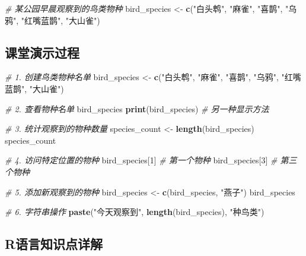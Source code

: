 \documentclass[
  twoside]{book}
\newenvironment{Shaded}{\begin{snugshade}}{\end{snugshade}}
\newcommand{\CommentTok}[1]{\textcolor[rgb]{0.56,0.35,0.01}{\textit{#1}}}
\newcommand{\DecValTok}[1]{\textcolor[rgb]{0.00,0.00,0.81}{#1}}
\newcommand{\FunctionTok}[1]{\textcolor[rgb]{0.13,0.29,0.53}{\textbf{#1}}}
\newcommand{\NormalTok}[1]{#1}
\newcommand{\OtherTok}[1]{\textcolor[rgb]{0.56,0.35,0.01}{#1}}
\newcommand{\StringTok}[1]{\textcolor[rgb]{0.31,0.60,0.02}{#1}}
\begin{document}
\begin{Shaded}
\begin{Highlighting}[]
\CommentTok{\# 某公园早晨观察到的鸟类物种}
\NormalTok{bird\_species }\OtherTok{\textless{}{-}} \FunctionTok{c}\NormalTok{(}\StringTok{"白头鹎"}\NormalTok{, }\StringTok{"麻雀"}\NormalTok{, }\StringTok{"喜鹊"}\NormalTok{, }\StringTok{"乌鸦"}\NormalTok{, }\StringTok{"红嘴蓝鹊"}\NormalTok{, }\StringTok{"大山雀"}\NormalTok{)}
\end{Highlighting}
\end{Shaded}

\hypertarget{ux8bfeux5802ux6f14ux793aux8fc7ux7a0b-1}{%
\subsection{课堂演示过程}\label{ux8bfeux5802ux6f14ux793aux8fc7ux7a0b-1}}

\begin{Shaded}
\begin{Highlighting}[]
\CommentTok{\# 1. 创建鸟类物种名单}
\NormalTok{bird\_species }\OtherTok{\textless{}{-}} \FunctionTok{c}\NormalTok{(}\StringTok{"白头鹎"}\NormalTok{, }\StringTok{"麻雀"}\NormalTok{, }\StringTok{"喜鹊"}\NormalTok{, }\StringTok{"乌鸦"}\NormalTok{, }\StringTok{"红嘴蓝鹊"}\NormalTok{, }\StringTok{"大山雀"}\NormalTok{)}

\CommentTok{\# 2. 查看物种名单}
\NormalTok{bird\_species}
\FunctionTok{print}\NormalTok{(bird\_species)  }\CommentTok{\# 另一种显示方法}

\CommentTok{\# 3. 统计观察到的物种数量}
\NormalTok{species\_count }\OtherTok{\textless{}{-}} \FunctionTok{length}\NormalTok{(bird\_species)}
\NormalTok{species\_count}

\CommentTok{\# 4. 访问特定位置的物种}
\NormalTok{bird\_species[}\DecValTok{1}\NormalTok{]  }\CommentTok{\# 第一个物种}
\NormalTok{bird\_species[}\DecValTok{3}\NormalTok{]  }\CommentTok{\# 第三个物种}

\CommentTok{\# 5. 添加新观察到的物种}
\NormalTok{bird\_species }\OtherTok{\textless{}{-}} \FunctionTok{c}\NormalTok{(bird\_species, }\StringTok{"燕子"}\NormalTok{)}
\NormalTok{bird\_species}

\CommentTok{\# 6. 字符串操作}
\FunctionTok{paste}\NormalTok{(}\StringTok{"今天观察到"}\NormalTok{, }\FunctionTok{length}\NormalTok{(bird\_species), }\StringTok{"种鸟类"}\NormalTok{)}
\end{Highlighting}
\end{Shaded}

\hypertarget{rux8bedux8a00ux77e5ux8bc6ux70b9ux8be6ux89e3-1}{%
\subsection{R语言知识点详解}\label{rux8bedux8a00ux77e5ux8bc6ux70b9ux8be6ux89e3-1}}
\end{document}
